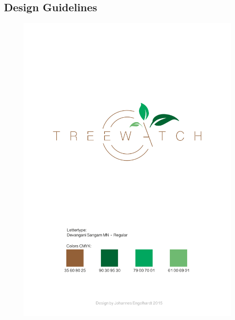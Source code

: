 \documentclass[12pt]{article}
\begin{document}
\subsection{Design Guidelines}
\begin{figure}[h!]
	\centering
	\includegraphics[height=0.93\textheight]{IdentityForm.pdf}
\end{figure}
\end{document}

